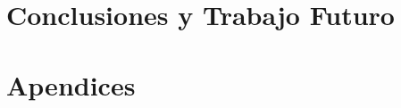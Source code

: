 \documentclass[11pt,a4paper,spanish]{book}
\numberwithin{equation}{chapter}
\numberwithin{figure}{chapter}
\begin{document}
\chapter{Conclusiones y Trabajo Futuro}





\appendix
\chapter{Apendices}
\end{document}
